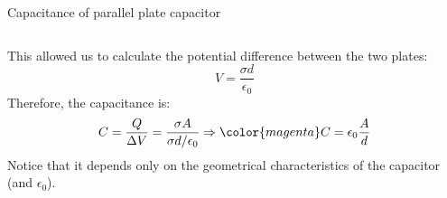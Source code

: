 \begin{frame}{Capacitance of parallel plate capacitor}
\begin{columns}
\begin{column}{0.70\textwidth}
\begin{equation*}
     \end{equation*}
     This allowed us to calculate the potential difference between the two plates:
     \begin{equation*}
         V =  \frac{\sigma d}{\epsilon_0}
     \end{equation*}
     Therefore, the capacitance is:
     \begin{equation*}
        C = \frac{Q}{{\Delta}V} = \frac{\sigma A}{\sigma d / \epsilon_0} \Rightarrow {\color{magenta} C = \epsilon_0 \frac{A}{d}}
     \end{equation*}
     Notice that it depends only on the geometrical characteristics of the capacitor (and $\epsilon_0$).
  \end{column}
\end{columns}

\end{frame}



%
%

